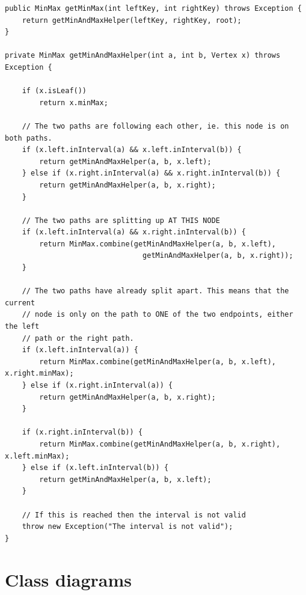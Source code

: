 \begin{lstlisting}
public MinMax getMinMax(int leftKey, int rightKey) throws Exception {
    return getMinAndMaxHelper(leftKey, rightKey, root);
}

private MinMax getMinAndMaxHelper(int a, int b, Vertex x) throws Exception {

    if (x.isLeaf())
        return x.minMax;

    // The two paths are following each other, ie. this node is on both paths.
    if (x.left.inInterval(a) && x.left.inInterval(b)) {
        return getMinAndMaxHelper(a, b, x.left);
    } else if (x.right.inInterval(a) && x.right.inInterval(b)) {
        return getMinAndMaxHelper(a, b, x.right);
    }

    // The two paths are splitting up AT THIS NODE
    if (x.left.inInterval(a) && x.right.inInterval(b)) {
        return MinMax.combine(getMinAndMaxHelper(a, b, x.left),
                                getMinAndMaxHelper(a, b, x.right));
    }

    // The two paths have already split apart. This means that the current
    // node is only on the path to ONE of the two endpoints, either the left
    // path or the right path.
    if (x.left.inInterval(a)) {
        return MinMax.combine(getMinAndMaxHelper(a, b, x.left), x.right.minMax);
    } else if (x.right.inInterval(a)) {
        return getMinAndMaxHelper(a, b, x.right);
    }

    if (x.right.inInterval(b)) {
        return MinMax.combine(getMinAndMaxHelper(a, b, x.right), x.left.minMax);
    } else if (x.left.inInterval(b)) {
        return getMinAndMaxHelper(a, b, x.left);
    }

    // If this is reached then the interval is not valid
    throw new Exception("The interval is not valid");
}
\end{lstlisting}

\section{Class diagrams} \label{app:class-diagrams}


